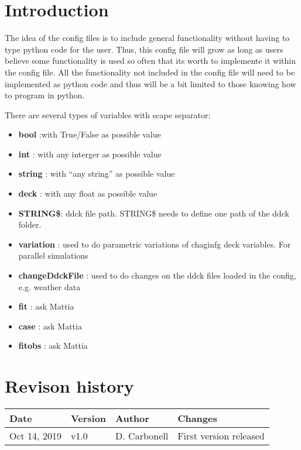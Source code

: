 \documentclass[english]{SPFReport}
\author{Dr. Daniel Carbonell}
\newcommand\Tstrut{\rule{0pt}{2.6ex}}         %
\newcommand\Bstrut{\rule[-0.9ex]{0pt}{0pt}}   %
\begin{document}
 


\section{Introduction}

The idea of the config files is to include general functionality without having to type python code for the user.
Thus, this config file will grow as long as users believe some functionality is used so often that its worth to implemente it within the config file. All the functionality not included in the config file will need to be implemented as python code and thus will be a bit limited to those knowing how to program in python. 

There are several types of variables with scape separator:
\begin{itemize}
\item \textbf{bool} :with True/False as possible value
\item \textbf{int} : with any interger as possible value
\item \textbf{string} : with ``any string'' as possible value
\item \textbf{deck} : with any float as possible value
\item \textbf{STRING\$}: ddck file path. STRING\$ needs to define one path of the ddck folder. 
\item \textbf{variation} : used to do parametric variations of chaginfg deck variables. For parallel simulations
\item \textbf{changeDdckFile} : used to do changes on the ddck files loaded in the config, e.g. weather data
\item \textbf{fit} : ask Mattia
\item \textbf{case} : ask Mattia
\item \textbf{fitobs} : ask Mattia



\end{itemize}
\section{Revison history}


\begin{tabular}{| l |  l | l  | p{80mm} | }\hline

    \textbf{Date} & \textbf{Version} & \textbf{Author}&\textbf{Changes}  \\\hline
\Tstrut\Bstrut     Oct 14, 2019 & v1.0 & D. Carbonell&First version released \\\hline
  \end{tabular}
\end{document}
